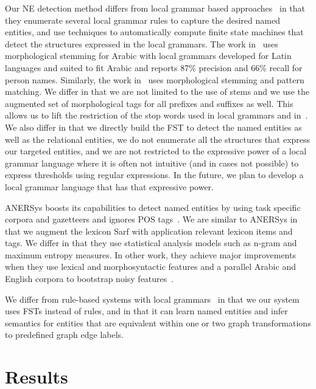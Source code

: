 \documentclass{llncs}
\begin{document}
Our NE detection method differs from 
local grammar based approaches~\cite{ZAGHOUANI10,Traboulsi:09}
in that they enumerate several local grammar rules
to capture the desired named entities, 
and use techniques to automatically compute finite state 
machines that detect the structures expressed in the 
local grammars.
The work in~\cite{ZAGHOUANI10} uses morphological stemming
for Arabic with local grammars developed for Latin languages 
and suited to fit Arabic and reports 87\% precision and 
66\% recall for person names. 
Similarly, the work in~\cite{jumaily2011,TAGARAB98} 
uses morphological stemming and pattern matching. 
We differ in that we are not limited to the use of stems 
and we use the augmented
set of morphological tags for all prefixes and suffixes as well.
This allows us to lift the restriction of the stop words 
used in local grammars and in~\cite{Abuleil04}.
We also differ in that we directly build the
FST to detect the named entities as well 
as the relational entities, 
we do not enumerate all the structures that express our targeted
entities, and we are not restricted to the expressive power of 
a local grammar language where it is often not intuitive 
(and in cases not possible) to express thresholds using regular 
expressions. 
In the future, we plan to develop a local
grammar language that has that expressive power.

ANERSys boosts its capabilities to detect named entities by using 
task specific corpora and gazetteers and ignores 
POS tags~\cite{Benajiba:07,Benajiba:08}. 
We are similar to ANERSys in that we augment the lexicon Sarf
with application relevant lexicon items and tags. 
We differ in that they use statistical analysis models such as
n-gram and maximum entropy measures.
In other work, they
achieve major improvements when they use lexical and
morphosyntactic features and a parallel Arabic and English 
corpora to bootstrap noisy features~\cite{BenajibaZDR10}. 

We differ from rule-based systems with local 
grammars~\cite{ShaalanR09} in that we our system 
uses FSTs instead of rules, and in that it can learn named 
entities and infer semantics
for entities that are equivalent within one or two graph 
transformations to predefined graph edge labels. 


\section{Results}
\label{sec:results}
\end{document}
